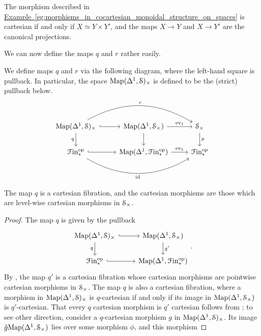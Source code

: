 \documentclass[main.tex]{subfiles}
\begin{document}
\begin{example}
  The morphism described in \hyperref[eg:morphisms_in_cocartesian_monoidal_structure_on_spaces]{Example~\ref*{eg:morphisms_in_cocartesian_monoidal_structure_on_spaces}} is cartesian if and only if $X \simeq Y \times Y'$, and the maps $X \to Y$ and $X \to Y'$ are the canonical projections.
\end{example}

We can now define the maps $q$ and $r$ rather easily.

\begin{definition}
  We define maps $q$ and $r$ via the following diagram, where the left-hand square is pullback. In particular, the space $\Map(\Delta^{1}, \S)_{\times}$ is defined to be the (strict) pullback below.
  \begin{equation*}
    \begin{tikzcd}
      \Map(\Delta^{1}, \S)_{\times}
      \arrow[r, hook]
      \arrow[rr, bend left, "r"]
      \arrow[d, swap, "q"]
      & \Map(\Delta^{1}, \S_{\times})
      \arrow[r, "\ev_{1}"]
      \arrow[d]
      & \S_{\times}
      \arrow[d, "p"]
      \\
      \Finp\op
      \arrow[r, hook]
      \arrow[rr, bend right, swap, "\id"]
      & \Map(\Delta^{1}, \Finp\op)
      \arrow[r, "\ev_{1}"]
      & \Finp\op
    \end{tikzcd}
  \end{equation*}
\end{definition}

\begin{lemma}
  The map $q$ is a cartesian fibration, and the cartesian morphisms are those which are level-wise cartesian morphisms in $\S_{\times}$.
\end{lemma}
\begin{proof}
  The map $q$ is given by the pullback
  \begin{equation*}
    \begin{tikzcd}
      \Map(\Delta^{1}, \category{S})_{\times}
      \arrow[r, hook]
      \arrow[d, swap, "q"]
      & \Map(\Delta^{1}, \category{S}_{\times})
      \arrow[d, "q'"]
      \\
      \Finp\op
      \arrow[r, hook]
      & \Map(\Delta^{1}, \Finp\op)
    \end{tikzcd}.
  \end{equation*}
  By \cite[Prop.\ 3.1.2.1]{highertopostheory}, the map $q'$ is a cartesian fibration whose cartesian morphisms are pointwise cartesian morphisms in $\S_{\times}$. The map $q$ is also a cartesian fibration, where a morphism in $\Map(\Delta^{1}, \S)_{\times}$ is $q$-cartesian if and only if its image in $\Map(\Delta^{1}, \S_{\times})$ is $q'$-cartesian. That every $q$ cartesian morphism is $q'$ cartesian follows from \cite[Prop\ 2.4.1.3]{highertopostheory}; to see other direction, consider a $q$-cartesian morphism $g$ in $\Map(\Delta^{1}, \S)_{\times}$. Its image $\tilde{g}\Map(\Delta^{1}, \S_{\times})$ lies over some morphism $\phi$, and this morphism 
\end{proof}
\end{document}
